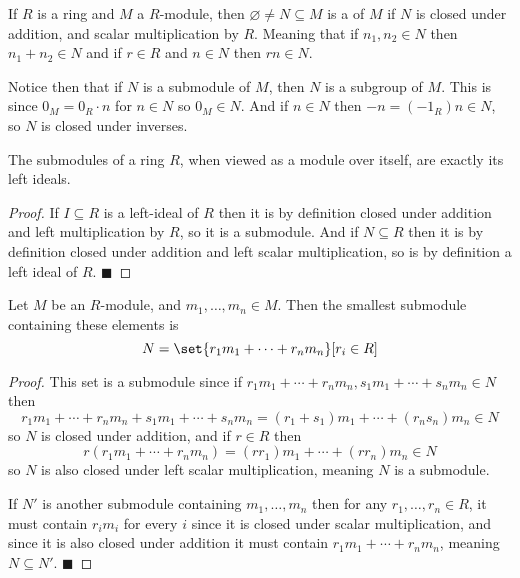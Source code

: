 \documentclass[10pt]{article}
\def\qed{\hskip1cm\hbox{}\hfill$\blacksquare$}
\begin{document}
\begin{defn*}

    If $R$ is a ring and $M$ a $R$-module, then $\varnothing\neq N\subseteq M$ is a  of $M$ if $N$ is closed under addition, and scalar multiplication by $R$.
    Meaning that if $n_1,n_2\in N$ then $n_1+n_2\in N$ and if $r\in R$ and $n\in N$ then $rn\in N$.

\end{defn*}

Notice then that if $N$ is a submodule of $M$, then $N$ is a subgroup of $M$.
This is since $0_M=0_R\cdot n$ for $n\in N$ so $0_M\in N$.
And if $n\in N$ then $-n=(-1_R)n\in N$, so $N$ is closed under inverses.

\begin{prop*}

    The submodules of a ring $R$, when viewed as a module over itself, are exactly its left ideals.

\end{prop*}

\begin{proof}

    If $I\subseteq R$ is a left-ideal of $R$ then it is by definition closed under addition and left multiplication by $R$, so it is a submodule.
    And if $N\subseteq R$ then it is by definition closed under addition and left scalar multiplication, so is by definition a left ideal of $R$.
    \qed

\end{proof}

\begin{prop*}

    Let $M$ be an $R$-module, and $m_1,\dots,m_n\in M$.
    Then the smallest submodule containing these elements is
    \[ N = \set{r_1m_1+\cdots+r_nm_n}[r_i\in R] \]

\end{prop*}

\begin{proof}

    This set is a submodule since if $r_1m_1+\cdots+r_nm_n,s_1m_1+\cdots+s_nm_n\in N$ then
    \[ r_1m_1+\cdots+r_nm_n + s_1m_1+\cdots+s_nm_n = (r_1+s_1)m_1+\cdots+(r_ns_n)m_n \in N \]
    so $N$ is closed under addition, and if $r\in R$ then
    \[ r(r_1m_1+\cdots+r_nm_n) = (rr_1)m_1+\cdots+(rr_n)m_n \in N \]
    so $N$ is also closed under left scalar multiplication, meaning $N$ is a submodule.

    If $N'$ is another submodule containing $m_1,\dots,m_n$ then for any $r_1,\dots,r_n\in R$, it must contain $r_im_i$ for every $i$ since it is closed under scalar multiplication, and since it is also
    closed under addition it must contain $r_1m_1+\cdots+r_nm_n$, meaning $N\subseteq N'$.
    \qed

\end{proof}
\end{document}
